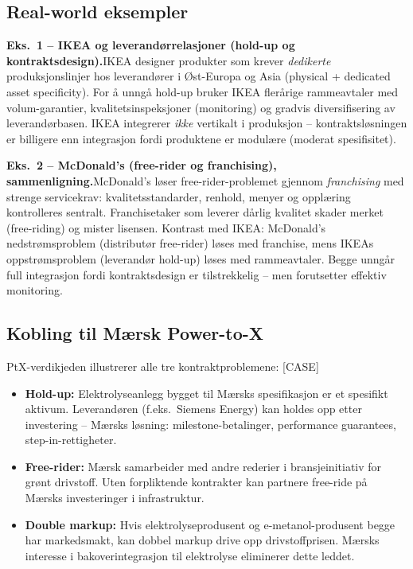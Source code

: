 \subsection*{Real-world eksempler}

\textbf{Eks.~1 -- IKEA og leverandørrelasjoner (hold-up og kontraktsdesign).}\quad [EKS]
IKEA designer produkter som krever \emph{dedikerte} produksjonslinjer hos leverandører i Øst-Europa og Asia (physical + dedicated asset specificity). For å unngå hold-up bruker IKEA flerårige rammeavtaler med volum-garantier, kvalitetsinspeksjoner (monitoring) og gradvis diversifisering av leverandørbasen. IKEA integrerer \emph{ikke} vertikalt i produksjon -- kontraktsløsningen er billigere enn integrasjon fordi produktene er modulære (moderat spesifisitet).

\textbf{Eks.~2 -- McDonald's (free-rider og franchising), sammenligning.}\quad [EKS]
McDonald's løser free-rider-problemet gjennom \emph{franchising} med strenge servicekrav: kvalitetsstandarder, renhold, menyer og opplæring kontrolleres sentralt. Franchisetaker som leverer dårlig kvalitet skader merket (free-riding) og mister lisensen. Kontrast med IKEA: McDonald's nedstrømsproblem (distributør free-rider) løses med franchise, mens IKEAs oppstrømsproblem (leverandør hold-up) løses med rammeavtaler. Begge unngår full integrasjon fordi kontraktsdesign er tilstrekkelig -- men forutsetter effektiv monitoring.

\subsection*{Kobling til Mærsk Power-to-X}
PtX-verdikjeden illustrerer alle tre kontraktproblemene: [CASE]
\begin{itemize}\setlength{\itemsep}{2pt}
\item \textbf{Hold-up:} Elektrolyseanlegg bygget til Mærsks spesifikasjon er et spesifikt aktivum. Leverandøren (f.eks.\ Siemens Energy) kan holdes opp etter investering -- Mærsks løsning: milestone-betalinger, performance guarantees, step-in-rettigheter.
\item \textbf{Free-rider:} Mærsk samarbeider med andre rederier i bransjeinitiativ for grønt drivstoff. Uten forpliktende kontrakter kan partnere free-ride på Mærsks investeringer i infrastruktur.
\item \textbf{Double markup:} Hvis elektrolyseprodusent og e-metanol-produsent begge har markedsmakt, kan dobbel markup drive opp drivstoffprisen. Mærsks interesse i bakoverintegrasjon til elektrolyse eliminerer dette leddet.
\end{itemize}

